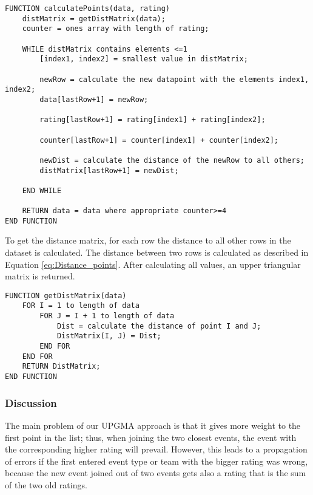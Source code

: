 \begin{lstlisting}[caption={Algorithm joining all points similar two each other},label={lst:UPGMA}]
FUNCTION calculatePoints(data, rating)
	distMatrix = getDistMatrix(data);
	counter = ones array with length of rating;
	
	WHILE distMatrix contains elements <=1
		[index1, index2] = smallest value in distMatrix;
		
		newRow = calculate the new datapoint with the elements index1, index2;
		data[lastRow+1] = newRow;
		
		rating[lastRow+1] = rating[index1] + rating[index2];

		counter[lastRow+1] = counter[index1] + counter[index2];
		
		newDist = calculate the distance of the newRow to all others;
		distMatrix[lastRow+1] = newDist;

	END WHILE

	RETURN data = data where appropriate counter>=4
END FUNCTION
\end{lstlisting}

To get the distance matrix, for each row the distance to all other rows in the dataset is calculated. The distance between two rows is calculated as described in Equation \ref{eq:Distance_points}.
After calculating all values, an upper triangular matrix is returned.

\begin{lstlisting}[caption={Algorithm to calculate the distance of two points}]
FUNCTION getDistMatrix(data)
	FOR I = 1 to length of data
		FOR J = I + 1 to length of data
			Dist = calculate the distance of point I and J;
			DistMatrix(I, J) = Dist;
		END FOR
	END FOR
	RETURN DistMatrix;
END FUNCTION
\end{lstlisting}

\subsubsection{Discussion}

The main problem of our UPGMA approach is that it gives more weight to the first point in the list; thus, when joining the two closest events, the event with the corresponding higher rating will prevail. However, this leads to a propagation of errors if the first entered event type or team with the bigger rating was wrong, because the new event joined out of two events gets also a rating that is the sum of the two old ratings.



